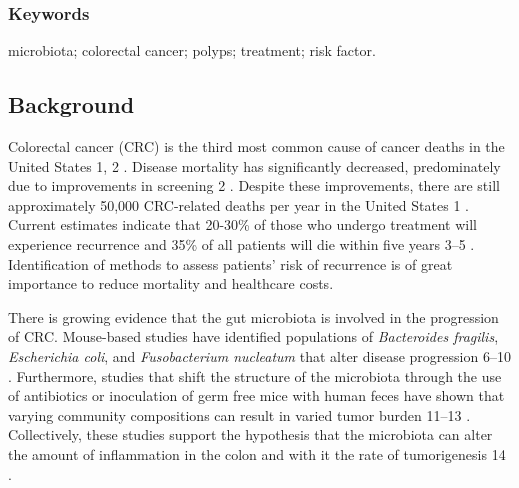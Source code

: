 \documentclass[12pt,]{article}
\providecommand{\DIFaddtex}[1]{{\protect\color{blue}\uwave{#1}}} %
\providecommand{\DIFaddbegin}{} %
\providecommand{\DIFaddend}{} %
\providecommand{\DIFdelbegin}{} %
\providecommand{\DIFdelend}{} %
\providecommand{\DIFadd}[1]{\texorpdfstring{\DIFaddtex{#1}}{#1}} %
\begin{document}
\subsubsection{Keywords}\label{keywords}

microbiota; colorectal cancer; polyps; treatment; risk factor.

\newpage

\subsection{Background}\label{background}

Colorectal cancer (CRC) is the third most common cause of cancer deaths
in the United States \DIFdelbegin %
\DIFdelend \DIFaddbegin \DIFadd{(}\DIFaddend 1, 2\DIFdelbegin %
\DIFdelend \DIFaddbegin \DIFadd{)}\DIFaddend . Disease mortality has significantly
decreased, predominately due to improvements in screening \DIFdelbegin %
\DIFdelend \DIFaddbegin \DIFadd{(}\DIFaddend 2\DIFdelbegin %
\DIFdelend \DIFaddbegin \DIFadd{)}\DIFaddend . Despite
these improvements, there are still approximately 50,000 CRC-related
deaths per year in the United States \DIFdelbegin %
\DIFdelend \DIFaddbegin \DIFadd{(}\DIFaddend 1\DIFdelbegin %
\DIFdelend \DIFaddbegin \DIFadd{)}\DIFaddend . Current estimates indicate
that 20-30\% of those who undergo treatment will experience recurrence
and 35\% of all patients will die within five years \DIFdelbegin %
\DIFdelend \DIFaddbegin \DIFadd{(}\DIFaddend 3--5\DIFdelbegin %
\DIFdelend \DIFaddbegin \DIFadd{)}\DIFaddend .
Identification of methods to assess patients' risk of recurrence is of
great importance to reduce mortality and healthcare costs.

There is growing evidence that the gut microbiota is involved in the
progression of CRC. Mouse-based studies have identified populations of
\emph{Bacteroides fragilis}, \emph{Escherichia coli}, and
\emph{Fusobacterium nucleatum} that alter disease progression \DIFdelbegin %
\DIFdelend \DIFaddbegin \DIFadd{(}\DIFaddend 6--10\DIFdelbegin %
\DIFdelend \DIFaddbegin \DIFadd{)}\DIFaddend .
Furthermore, studies that shift the structure of the microbiota through
the use of antibiotics or inoculation of germ free mice with human feces
have shown that varying community compositions can result in varied
tumor burden \DIFdelbegin %
\DIFdelend \DIFaddbegin \DIFadd{(}\DIFaddend 11--13\DIFdelbegin %
\DIFdelend \DIFaddbegin \DIFadd{)}\DIFaddend . Collectively, these studies support the
hypothesis that the microbiota can alter the amount of inflammation in
the colon and with it the rate of tumorigenesis \DIFdelbegin %
\DIFdelend \DIFaddbegin \DIFadd{(}\DIFaddend 14\DIFdelbegin %
\DIFdelend \DIFaddbegin \DIFadd{)}\DIFaddend .
\end{document}

